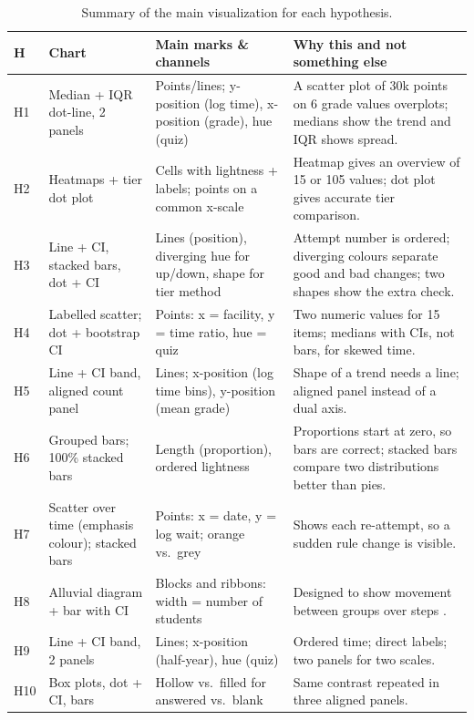 \begin{table}[H]
\centering
\small
\caption{Summary of the main visualization for each hypothesis.}
\label{tab:vischoices}
\begin{tabularx}{\linewidth}{@{}l >{\raggedright\arraybackslash}p{2.6cm} >{\raggedright\arraybackslash}p{3.5cm} X@{}}
\toprule
\textbf{H} & \textbf{Chart} & \textbf{Main marks \& channels} & \textbf{Why this and not something else} \\
\midrule
H1 & Median + IQR dot-line, 2 panels & Points/lines; y-position (log time), x-position (grade), hue (quiz) & A scatter plot of 30k points on 6 grade values overplots; medians show the trend and IQR shows spread. \\
H2 & Heatmaps + tier dot plot & Cells with lightness + labels; points on a common x-scale & Heatmap gives an overview of 15 or 105 values; dot plot gives accurate tier comparison. \\
H3 & Line + CI, stacked bars, dot + CI & Lines (position), diverging hue for up/down, shape for tier method & Attempt number is ordered; diverging colours separate good and bad changes; two shapes show the extra check. \\
H4 & Labelled scatter; dot + bootstrap CI & Points: x = facility, y = time ratio, hue = quiz & Two numeric values for 15 items; medians with CIs, not bars, for skewed time. \\
H5 & Line + CI band, aligned count panel & Lines; x-position (log time bins), y-position (mean grade) & Shape of a trend needs a line; aligned panel instead of a dual axis. \\
H6 & Grouped bars; 100\% stacked bars & Length (proportion), ordered lightness & Proportions start at zero, so bars are correct; stacked bars compare two distributions better than pies. \\
H7 & Scatter over time (emphasis colour); stacked bars & Points: x = date, y = log wait; orange vs.\ grey & Shows each re-attempt, so a sudden rule change is visible. \\
H8 & Alluvial diagram + bar with CI & Blocks and ribbons: width = number of students & Designed to show movement between groups over steps \citep{rosvall2010mapping}. \\
H9 & Line + CI band, 2 panels & Lines; x-position (half-year), hue (quiz) & Ordered time; direct labels; two panels for two scales. \\
H10 & Box plots, dot + CI, bars & Hollow vs.\ filled for answered vs.\ blank & Same contrast repeated in three aligned panels. \\
\bottomrule
\end{tabularx}
\end{table}

